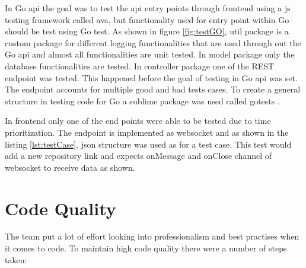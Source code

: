 In Go \gls{api} the goal was to test the \gls{api} entry points through \gls{frontend} using a \gls{js} testing framework called \gls{ava}, but functionality used for entry point within Go should be test using Go test. As shown in figure \ref{fig:testGO}, util package is a custom package for different logging functionalities that are used through out the Go \gls{api} and almost all functionalities are unit tested. In model package only the database functionalities are tested. In controller package one of the REST endpoint was tested. This happened before the goal of testing in Go \gls{api} was set. The endpoint accounts for multiple good and bad tests cases. To create a general structure in testing code for Go a sublime package was used called gotests \cite{github:gotestsplugin}.



In \gls{frontend} only one of the end points were able to be tested due to time prioritization. The endpoint is implemented as \gls{websocket} and as shown in the listing \ref{lst:testCase}, \gls{json} structure was used as for a test case. This test would add a new repository link and expects onMessage and onClose channel of \gls{websocket} to receive data as shown.

\section{Code Quality}
The team put a lot of effort looking into professionalism and best practises when it comes to code. To maintain high code quality there were a number of steps taken:


